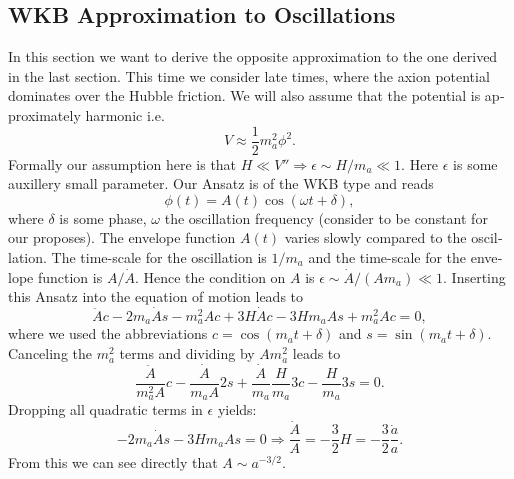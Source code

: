 \documentclass[master,       %
               twoside,        %
               BCOR10mm,       %
               english,ngerman, %
               ]{GAUBM}
\begin{document}
\begin{otherlanguage}{english}
\subsection{WKB Approximation to Oscillations}
\label{sec:wkb_approximation}

In this section we want to derive the opposite approximation to the one derived in the last section.
This time we consider late times, where the axion potential dominates over the Hubble friction.
We will also assume that the potential is approximately harmonic i.e.
\begin{equation}
	V \approx \frac{1}{2} m_a^2 \phi^2.
\end{equation}
Formally our assumption here is that $H \ll V'' \Rightarrow \epsilon \sim H / m_a \ll 1$. Here $\epsilon$ is some auxillery small parameter.
Our Ansatz is of the WKB type and reads
\begin{equation}
	\phi(t) = A(t) \cos(\omega t + \delta),
\end{equation}
where $\delta$ is some phase, $\omega$ the oscillation frequency (consider to be constant for our proposes). The envelope function $A(t)$ varies slowly compared to the oscillation. The time-scale for the oscillation is $1/m_a$ and the time-scale for the envelope function is $A / \dot{A}$. Hence the condition on $A$ is $\epsilon \sim \dot{A} / (A m_a) \ll 1$.
Inserting this Ansatz into the equation of motion leads to
\begin{equation}
	\ddot{A} c - 2 m_a \dot{A} s - m_a^2 A c + 3 H \dot{A} c - 3 H m_a A s + m_a^2 A c = 0,
\end{equation}
where we used the abbreviations $c = \cos(m_a t + \delta)$ and $s = \sin(m_a t + \delta)$.
Canceling the $m_a^2$ terms and dividing by $A m_a^2$ leads to
\begin{equation}
	\frac{\ddot{A}}{m_a^2 A} c - \frac{\dot{A}}{m_a A} 2 s + \frac{\dot{A}}{m_a} \frac{H}{m_a} 3 c - \frac{H}{m_a} 3 s = 0.
\end{equation} 
Dropping all quadratic terms in $\epsilon$ yields:
\begin{equation}
	 - 2 m_a \dot{A} s - 3 H m_a A s = 0 \Rightarrow \frac{\dot{A}}{A} = - \frac{3}{2} H = - \frac{3}{2} \frac{\dot{a}}{a}.
\end{equation}
From this we can see directly that $A \sim a^{-3/2}$.


\end{otherlanguage}
\end{document}
